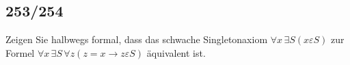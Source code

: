 \subsection*{253/254}


\begin{exercise}[253]

Zeigen Sie halbwegs formal, dass das schwache Singletonaxiom $\forall x\, \exists S(x \varepsilon S)$
zur Formel $\forall x\, \exists S \, \forall z (z = x \rightarrow z \varepsilon S)$
äquivalent ist.

\end{exercise}



